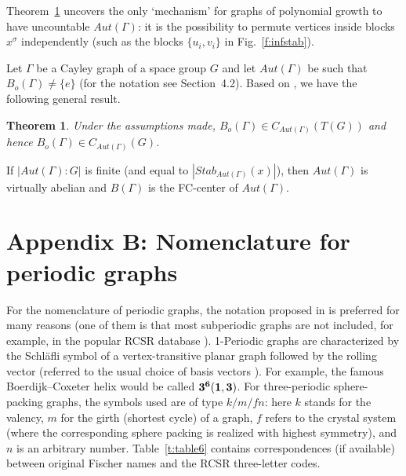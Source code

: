 \documentclass[11pt,a4paper]{article}
\newtheorem{theorem}{Theorem}
\begin{document}
\noindent Theorem~\ref{teo5} uncovers the only `mechanism' for graphs of polynomial growth to have uncountable $Aut(\Gamma)$: it is the possibility to permute vertices inside blocks $x^\sigma$ independently (such as the blocks $\{u_i, v_i\}$ in Fig.~\ref{f:infstab}).

Let $\Gamma$ be a Cayley graph of a space group $G$ and let $Aut(\Gamma)$ be such that $B_o(\Gamma) \neq \{e\}$ (for the notation see Section~4.2). Based on \cite{Trofimov83, Trofimov84}, we have the following general result.

\begin{theorem}
\label{teo5}
Under the assumptions made, $B_o(\Gamma) \in C_{Aut(\Gamma)}(T(G))$ and hence $B_o(\Gamma) \in C_{Aut(\Gamma)}(G)$.
\end{theorem}

\noindent If $|Aut(\Gamma):G|$ is finite (and equal to $|Stab_{Aut(\Gamma)}(x)|$), then $Aut(\Gamma)$ is virtually abelian and $B(\Gamma)$ is the FC-center of $Aut(\Gamma)$.

\section{Appendix B: Nomenclature for periodic graphs}
For the nomenclature of periodic graphs, the notation proposed in \cite{Fischer71, KF78} is preferred for many reasons (one of them is that most subperiodic graphs are not included, for example, in the popular RCSR database \cite{RCSR}). 1-Periodic graphs are characterized by the Schl{\"a}fli symbol of a vertex-transitive planar graph followed by the rolling vector (referred to the usual choice of basis vectors \cite{ITE}). For example, the famous Boerdijk--Coxeter helix would be called $\bf 3^6(1, 3)$. For three-periodic sphere-packing graphs, the symbols used are of type $k/m/fn$: here $k$ stands for the valency, $m$ for the girth (shortest cycle) of a graph, $f$ refers to the crystal system (where the corresponding sphere packing is realized with highest symmetry), and $n$ is an arbitrary number. Table~\ref{t:table6} contains correspondences (if available) between original Fischer names and the RCSR three-letter codes. %
\end{document}
